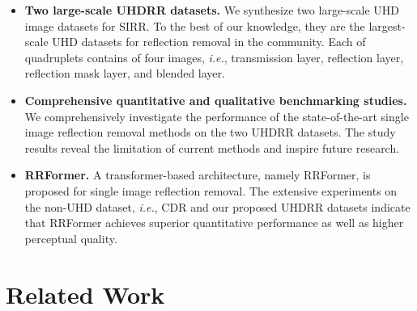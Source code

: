 \documentclass[10pt,journal]{IEEEtran}
\begin{document}
\begin{itemize}
	\item \textbf{Two large-scale UHDRR datasets.} We synthesize two large-scale UHD image datasets for SIRR. To the best of our knowledge, they are the largest-scale UHD datasets for reflection removal in the community. Each of quadruplets contains of four images, \textit{i.e.}, transmission layer, reflection layer, reflection mask layer, and blended layer. 
	
	\item \textbf{Comprehensive quantitative and qualitative benchmarking studies.} We comprehensively investigate the performance of the state-of-the-art single image reflection removal methods on the two UHDRR datasets. The study results reveal the limitation of current methods and inspire future research. 
	
	\item \textbf{RRFormer.} A transformer-based architecture, namely RRFormer, is proposed for single image reflection removal. The extensive experiments on the non-UHD dataset, \textit{i.e.}, CDR and our proposed UHDRR datasets indicate that RRFormer achieves superior quantitative performance as well as higher perceptual quality. 
\end{itemize}

\section{Related Work}
\end{document}
